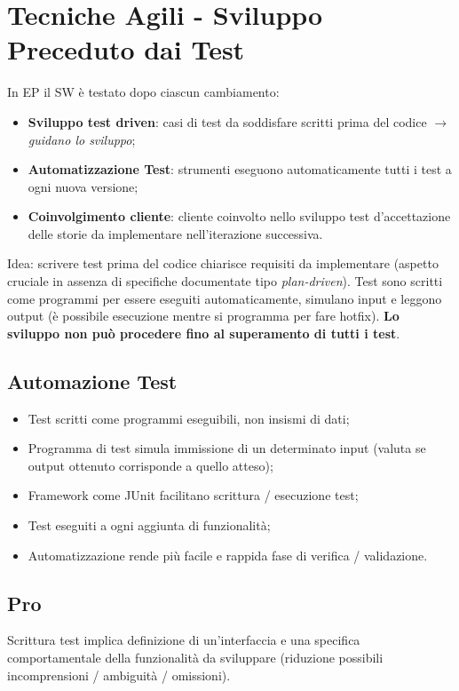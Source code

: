 \documentclass{article}
\begin{document}
  \section{Tecniche Agili - Sviluppo Preceduto dai Test}
    In EP il SW è testato dopo ciascun cambiamento:
    \begin{itemize}
      \item \textbf{Sviluppo test driven}: casi di test da soddisfare scritti prima del codice $\rightarrow$ \textit{guidano lo sviluppo};
      \item \textbf{Automatizzazione Test}: strumenti eseguono automaticamente tutti i test a ogni nuova versione;
      \item \textbf{Coinvolgimento cliente}: cliente coinvolto nello sviluppo test d'accettazione delle storie da implementare nell'iterazione successiva. 
    \end{itemize}
    Idea: scrivere test prima del codice chiarisce requisiti da implementare (aspetto cruciale in assenza di specifiche documentate tipo \textit{plan-driven}). Test sono scritti come programmi per essere eseguiti automaticamente, simulano input e leggono output (è possibile esecuzione mentre si programma per fare hotfix). \textbf{Lo sviluppo non può procedere fino al superamento di tutti i test}.
    \subsection{Automazione Test}
      \begin{itemize}
        \item Test scritti come programmi eseguibili, non insismi di dati;
        \item Programma di test simula immissione di un determinato input (valuta se output ottenuto corrisponde a quello atteso);
        \item Framework come JUnit facilitano scrittura / esecuzione test;
        \item Test eseguiti a ogni aggiunta di funzionalità;
        \item Automatizzazione rende più facile e rappida fase di verifica / validazione.
      \end{itemize}
    \subsection{Pro}
      Scrittura test implica definizione di un'interfaccia e una specifica comportamentale della funzionalità da sviluppare (riduzione possibili incomprensioni / ambiguità / omissioni). 
\end{document}
